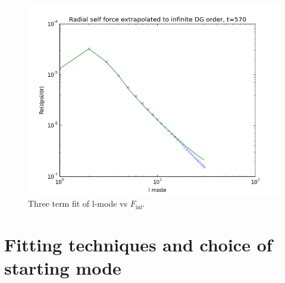\begin{figure}
  \includegraphics{finffit570}
  \caption{Three term fit of l-mode vs $F_{\inf}$.} 
\label{lmodefit}
\end{figure}

\section{Fitting techniques and choice of starting mode}

